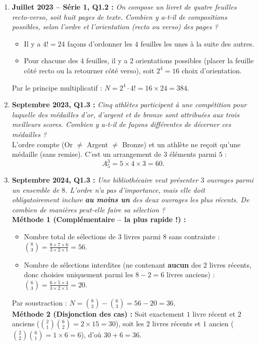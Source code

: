 \begin{exemple}
\begin{enumerate}
    \item \textbf{Juillet 2023 -- Série 1, Q1.2 :} \emph{On compose un livret de quatre feuilles recto-verso, soit huit pages de texte. Combien y a-t-il de compositions possibles, selon l'ordre et l'orientation (recto ou verso) des pages ?}\\
    \begin{itemize}
        \item Il y a $4! = 24$ façons d'ordonner les $4$ feuilles les unes à la suite des autres.
        \item Pour chacune des $4$ feuilles, il y a $2$ orientations possibles (placer la feuille côté recto ou la retourner côté verso), soit $2^4 = 16$ choix d'orientation.
    \end{itemize}
    Par le principe multiplicatif : $N = 2^4 \cdot 4! = 16 \times 24 = \boxed{384}$.

    \item \textbf{Septembre 2023, Q1.3 :} \emph{Cinq athlètes participent à une compétition pour laquelle des médailles d'or, d'argent et de bronze sont attribuées aux trois meilleurs scores. Combien y a-t-il de façons différentes de décerner ces médailles ?}\\
    L'ordre compte (Or $\neq$ Argent $\neq$ Bronze) et un athlète ne reçoit qu'une médaille (sans remise). C'est un arrangement de $3$ éléments parmi $5$ :
    \[
        A_5^3 = 5 \times 4 \times 3 = \boxed{60}.
    \]

    \item \textbf{Septembre 2024, Q1.3 :} \emph{Une bibliothécaire veut présenter $3$ ouvrages parmi un ensemble de $8$. L'ordre n'a pas d'importance, mais elle doit obligatoirement inclure \textbf{au moins un} des deux ouvrages les plus récents. De combien de manières peut-elle faire sa sélection ?}\\
    \textbf{Méthode 1 (Complémentaire -- la plus rapide !) :}
    \begin{itemize}
        \item Nombre total de sélections de $3$ livres parmi $8$ sans contrainte : $\binom{8}{3} = \frac{8 \times 7 \times 6}{3 \times 2 \times 1} = 56$.
        \item Nombre de sélections interdites (ne contenant \textbf{aucun} des $2$ livres récents, donc choisies uniquement parmi les $8 - 2 = 6$ livres anciens) : $\binom{6}{3} = \frac{6 \times 5 \times 4}{3 \times 2 \times 1} = 20$.
    \end{itemize}
    Par soustraction : $N = \binom{8}{3} - \binom{6}{3} = 56 - 20 = \boxed{36}$.\\
    \textbf{Méthode 2 (Disjonction des cas) :} Soit exactement $1$ livre récent et $2$ anciens ($\binom{2}{1}\binom{6}{2} = 2 \times 15 = 30$), soit les $2$ livres récents et $1$ ancien ($\binom{2}{2}\binom{6}{1} = 1 \times 6 = 6$), d'où $30 + 6 = 36$.
\end{enumerate}
\end{exemple}

